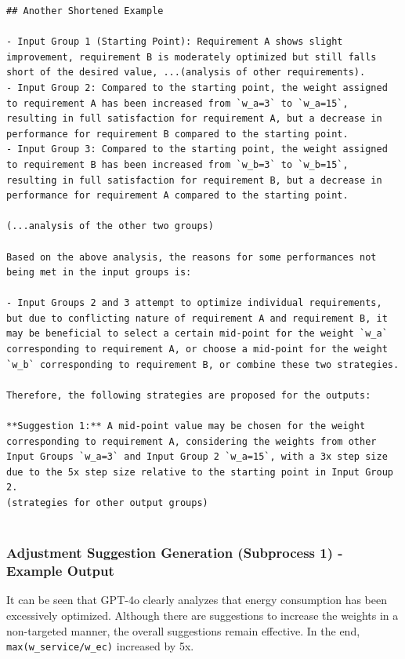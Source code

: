 \documentclass{article}
\begin{document}
\begin{verbatim}
## Another Shortened Example

- Input Group 1 (Starting Point): Requirement A shows slight improvement, requirement B is moderately optimized but still falls short of the desired value, ...(analysis of other requirements).
- Input Group 2: Compared to the starting point, the weight assigned to requirement A has been increased from `w_a=3` to `w_a=15`, resulting in full satisfaction for requirement A, but a decrease in performance for requirement B compared to the starting point.
- Input Group 3: Compared to the starting point, the weight assigned to requirement B has been increased from `w_b=3` to `w_b=15`, resulting in full satisfaction for requirement B, but a decrease in performance for requirement A compared to the starting point.

(...analysis of the other two groups)

Based on the above analysis, the reasons for some performances not being met in the input groups is:

- Input Groups 2 and 3 attempt to optimize individual requirements, but due to conflicting nature of requirement A and requirement B, it may be beneficial to select a certain mid-point for the weight `w_a` corresponding to requirement A, or choose a mid-point for the weight `w_b` corresponding to requirement B, or combine these two strategies.

Therefore, the following strategies are proposed for the outputs:

**Suggestion 1:** A mid-point value may be chosen for the weight corresponding to requirement A, considering the weights from other Input Groups `w_a=3` and Input Group 2 `w_a=15`, with a 3x step size due to the 5x step size relative to the starting point in Input Group 2.
(strategies for other output groups)


\end{verbatim}


\subsubsection{Adjustment Suggestion Generation (Subprocess 1) - Example Output}
It can be seen that GPT-4o clearly analyzes that energy consumption has been excessively optimized. Although there are suggestions to increase the weights in a non-targeted manner, the overall suggestions remain effective. In the end, \verb|max(w_service/w_ec)| increased by 5x.
\end{document}
